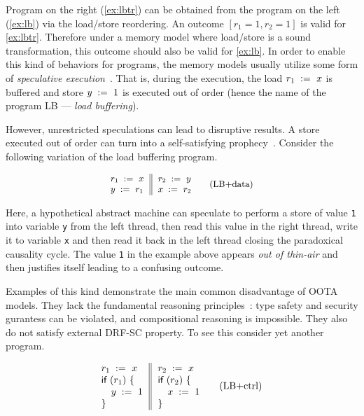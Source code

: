 Program on the right (\ref{ex:lbtr}) can be obtained 
from the program on the left (\ref{ex:lb})
via the load/store reordering.
An outcome $[r_1=1, r_2=1]$ is valid for \ref{ex:lbtr}.
Therefore under a memory model where load/store is a sound transformation, 
this outcome should also be valid for \ref{ex:lb}.
In order to enable this kind of behaviors for programs, 
the memory models usually utilize some form of 
\emph{speculative execution}~\cite{Boudol-Petri:ESOP10, Crary-Sullivan:POPL15}.
That is, during the execution, the load $r_1\;:=_{}\;x$
is buffered and store $y\;:=_{}\;1$ is executed out of order
(hence the name of the program LB --- \emph{load buffering}).

However, unrestricted speculations can lead to disruptive results. 
A store executed out of order can turn into 
a self-satisfying prophecy~\cite{Boehm-Demsky:MSPC14}.
Consider the following variation of the load buffering program. 

\begin{equation*}
\small
\inarrII{
  \readInst{}{r_1}{x}   \\
  \writeInst{}{y}{r_1}  \\
}{
  \readInst{}{r_2}{y}   \\
  \writeInst{}{x}{r_2}  \\
}
\tag{LB+data}\label{ex:lb+data}
\end{equation*}

Here, a hypothetical abstract machine can speculate 
to perform a store of value \texttt{1} into variable \texttt{y}
from the left thread, then read this value in the right thread, 
write it to variable \texttt{x} and then read it back in the
left thread closing the paradoxical causality cycle.
The value \texttt{1} in the example above appears \emph{out of thin-air}
and then justifies itself leading to a confusing outcome.
 
Examples of this kind demonstrate the main common 
disadvantage of OOTA models.
They lack the fundamental reasoning 
principles~\cite{Boehm-Demsky:MSPC14, Batty-al:ESOP15}:
type safety and security gurantess can be violated, 
and compositional reasoning is impossible.
They also do not satisfy external DRF-SC property.
To see this consider yet another program.

\begin{equation*}
\inarrII{
  \readInst{}{r_1}{x}      \\
  \kw{if} {(r_1)} ~\{      \\
  \quad\writeInst{}{y}{1}  \\
  \}
}{
  \readInst{}{r_2}{x}      \\
  \kw{if} {(r_2)} ~\{      \\
  \quad\writeInst{}{x}{1}  \\
  \}
}
\tag{LB+ctrl}\label{ex:lb+ctrl}
\end{equation*}

